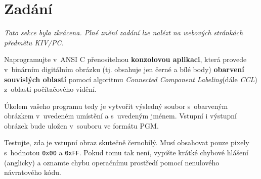 \section{Zadání}

\textit{Tato sekce byla zkrácena. Plné znění zadání lze nalézt na webových stránkách předmětu KIV/PC.}

\vspace{0.5cm}

Naprogramujte v~ANSI C přenositelnou \textbf{konzolovou aplikaci}, která provede v~binárním digitálním obrázku
(tj. obsahuje jen černé a bílé body) \textbf{obarvení souvislých oblastí} pomocí algoritmu \textit{Connected Component
Labeling}\footnotemark[1] (dále \textit{CCL}) z~oblasti počítačového vidění.

Úkolem vašeho programu tedy je vytvořit výsledný soubor s~obarveným obrázkem v~uvedeném
umístění a s~uvedeným jménem. Vstupní i výstupní obrázek bude uložen v~souboru ve formátu
PGM\footnotemark[1].

Testujte, zda je vstupní obraz skutečně černobílý. Musí obsahovat pouze pixely s~hodnotou
\verb|0x00| a \verb|0xFF|. Pokud tomu tak není, vypište krátké chybové hlášení (anglicky) a oznamte chybu
operačnímu prostředí pomocí nenulového návratového kódu.

